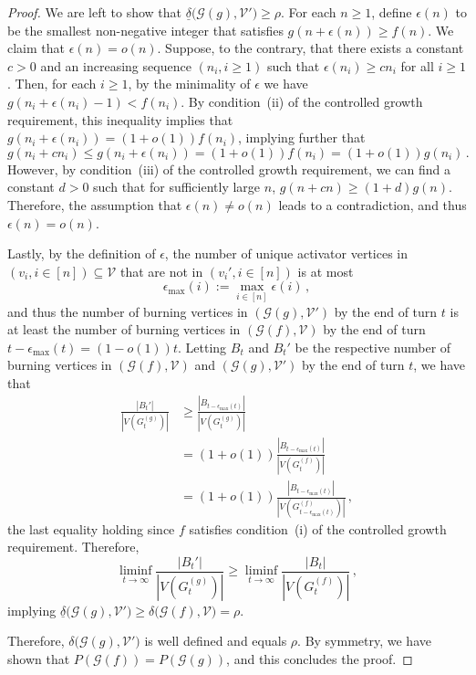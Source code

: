 \documentclass[12pt]{article}
\theoremstyle{remark}
\newcommand\cG{\mathcal G}
\newcommand\cV{\mathcal V}
\begin{document}
\begin{proof}
We are left to show that $\underline{\delta}\big( \cG(g), \cV' \big) \geq \rho$. For each $n \geq 1$, define $\epsilon(n)$ to be the smallest non-negative integer that satisfies $g(n+\epsilon(n)) \geq f(n)$. We claim that $\epsilon(n) = o(n)$. Suppose, to the contrary, that there exists a constant $c > 0$ and an increasing sequence $(n_i,i\geq 1)$ such that $\epsilon(n_i) \geq cn_i$ for all $i \geq 1$. Then, for each $i \geq 1$, by the minimality of $\epsilon$ we have $g(n_i+\epsilon(n_i)-1) < f(n_i)$. By condition~(ii) of the controlled growth requirement, this inequality implies that $g(n_i+\epsilon(n_i)) = (1+o(1)) f(n_i)$, implying further that 
\[
g(n_i + cn_i) \leq g(n_i+\epsilon(n_i)) = (1+o(1))f(n_i) = (1+o(1))g(n_i) \,.
\] 
However, by condition~(iii) of the controlled growth requirement, we can find a constant $d > 0$ such that for sufficiently large $n$, $g(n + cn) \geq (1+d)g(n)$. Therefore, the assumption that $\epsilon(n) \neq o(n)$ leads to a contradiction, and thus $\epsilon(n) = o(n)$.

Lastly, by the definition of $\epsilon$, the number of unique activator vertices in $(v_i,i \in [n]) \subseteq \cV$ that are not in $(v_i',i \in [n])$ is at most
\[
\epsilon_{\max}(i) := \max_{i \in [n]} \epsilon(i) \,,
\]
and thus the number of burning vertices in $(\cG(g),\cV')$ by the end of turn $t$ is at least the number of burning vertices in $(\cG(f),\cV)$ by the end of turn $t-\epsilon_{\max}(t) = (1-o(1))t$. Letting $B_t$ and $B_t'$ be the respective number of burning vertices in $(\cG(f),\cV)$ and $(\cG(g),\cV')$ by the end of turn $t$, we have that 
\begin{align*}
\frac{|B_t'|}{|V(G^{(g)}_t)|}
&\geq
\frac{|B_{t-\epsilon_{\max}(t)}|}{|V(G^{(g)}_t)|}\\
&= 
(1+o(1))\frac{|B_{t-\epsilon_{\max}(t)}|}{|V(G^{(f)}_t)|}\\
&= 
(1+o(1))\frac{|B_{t-\epsilon_{\max}(t)}|}{|V(G^{(f)}_{t-\epsilon_{\max}(t)})|} \,,
\end{align*}
the last equality holding since $f$ satisfies condition~(i) of the controlled growth requirement. Therefore,
\[
\liminf_{t \to \infty} \frac{|B_t'|}{|V(G^{(g)}_t)|}
\geq
\liminf_{t \to \infty} \frac{|B_t|}{|V(G^{(f)}_t)|} \,,
\]
implying $\underline{\delta}\big( \cG(g), \cV' \big) \geq \delta\big( \cG(f), \cV \big) = \rho$.

Therefore, $\delta \big( \cG(g), \cV' \big)$ is well defined and equals $\rho$. By symmetry, we have shown that $P(\cG(f)) = P(\cG(g))$, and this concludes the proof.  
\end{proof}
\end{document}
